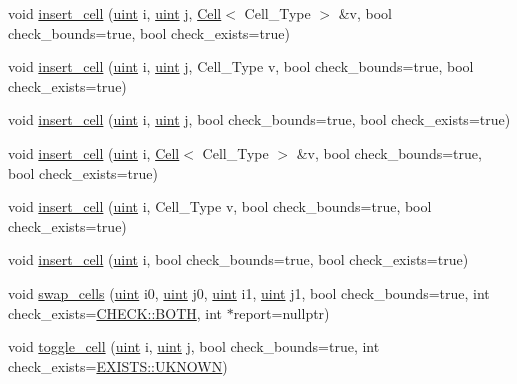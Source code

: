 \begin{DoxyCompactItemize}
\item 
void \hyperlink{class_b_array_a098b5214df6790a5b4aaf3e0f7c1473a}{insert\+\_\+cell} (\hyperlink{typedefs_8hpp_a91ad9478d81a7aaf2593e8d9c3d06a14}{uint} i, \hyperlink{typedefs_8hpp_a91ad9478d81a7aaf2593e8d9c3d06a14}{uint} j, \hyperlink{class_cell}{Cell}$<$ Cell\+\_\+\+Type $>$ \&v, bool check\+\_\+bounds=true, bool check\+\_\+exists=true)
\item 
void \hyperlink{class_b_array_aa7268761d977833b688123d161d17d1b}{insert\+\_\+cell} (\hyperlink{typedefs_8hpp_a91ad9478d81a7aaf2593e8d9c3d06a14}{uint} i, \hyperlink{typedefs_8hpp_a91ad9478d81a7aaf2593e8d9c3d06a14}{uint} j, Cell\+\_\+\+Type v, bool check\+\_\+bounds=true, bool check\+\_\+exists=true)
\item 
void \hyperlink{class_b_array_a4deb6afa6040603fc4fb5a90eef90761}{insert\+\_\+cell} (\hyperlink{typedefs_8hpp_a91ad9478d81a7aaf2593e8d9c3d06a14}{uint} i, \hyperlink{typedefs_8hpp_a91ad9478d81a7aaf2593e8d9c3d06a14}{uint} j, bool check\+\_\+bounds=true, bool check\+\_\+exists=true)
\item 
void \hyperlink{class_b_array_ac631a7a4b7308b00073a5e521d548933}{insert\+\_\+cell} (\hyperlink{typedefs_8hpp_a91ad9478d81a7aaf2593e8d9c3d06a14}{uint} i, \hyperlink{class_cell}{Cell}$<$ Cell\+\_\+\+Type $>$ \&v, bool check\+\_\+bounds=true, bool check\+\_\+exists=true)
\item 
void \hyperlink{class_b_array_aeeee5972aa4301465b84dfc431fa6cf9}{insert\+\_\+cell} (\hyperlink{typedefs_8hpp_a91ad9478d81a7aaf2593e8d9c3d06a14}{uint} i, Cell\+\_\+\+Type v, bool check\+\_\+bounds=true, bool check\+\_\+exists=true)
\item 
void \hyperlink{class_b_array_a8e930e9e59632684e9526f499bfff0e1}{insert\+\_\+cell} (\hyperlink{typedefs_8hpp_a91ad9478d81a7aaf2593e8d9c3d06a14}{uint} i, bool check\+\_\+bounds=true, bool check\+\_\+exists=true)
\item 
void \hyperlink{class_b_array_afb7976f67770b850922c1a7e1d6b07cc}{swap\+\_\+cells} (\hyperlink{typedefs_8hpp_a91ad9478d81a7aaf2593e8d9c3d06a14}{uint} i0, \hyperlink{typedefs_8hpp_a91ad9478d81a7aaf2593e8d9c3d06a14}{uint} j0, \hyperlink{typedefs_8hpp_a91ad9478d81a7aaf2593e8d9c3d06a14}{uint} i1, \hyperlink{typedefs_8hpp_a91ad9478d81a7aaf2593e8d9c3d06a14}{uint} j1, bool check\+\_\+bounds=true, int check\+\_\+exists=\hyperlink{namespace_c_h_e_c_k_a3acda1c74bfabb5b6b67e19d0ad2d52a}{C\+H\+E\+C\+K\+::\+B\+O\+TH}, int $\ast$report=nullptr)
\item 
void \hyperlink{class_b_array_a2ab2b200b329abc718cfb3574f566cf6}{toggle\+\_\+cell} (\hyperlink{typedefs_8hpp_a91ad9478d81a7aaf2593e8d9c3d06a14}{uint} i, \hyperlink{typedefs_8hpp_a91ad9478d81a7aaf2593e8d9c3d06a14}{uint} j, bool check\+\_\+bounds=true, int check\+\_\+exists=\hyperlink{namespace_e_x_i_s_t_s_a81eb362d951445c658942a433afddb97}{E\+X\+I\+S\+T\+S\+::\+U\+K\+N\+O\+WN})

\end{DoxyCompactItemize}
